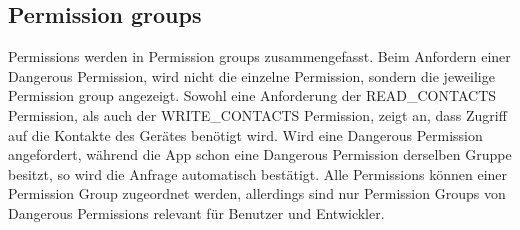 \documentclass[FIPLY_base.tex]{subfiles}
\begin{document}
\subsection{Permission groups}
Permissions werden in Permission groups zusammengefasst.
Beim Anfordern einer Dangerous Permission, wird nicht die einzelne Permission, sondern die jeweilige Permission group angezeigt.
Sowohl eine Anforderung der READ\_CONTACTS Permission, als auch der WRITE\_CONTACTS Permission, zeigt an, dass Zugriff auf die Kontakte des Gerätes benötigt wird. Wird eine Dangerous Permission angefordert, während die App schon eine Dangerous Permission derselben Gruppe besitzt, so wird die Anfrage automatisch bestätigt.
Alle Permissions können einer Permission Group zugeordnet werden, allerdings sind nur Permission Groups von Dangerous Permissions relevant für Benutzer und Entwickler.
\end{document}
